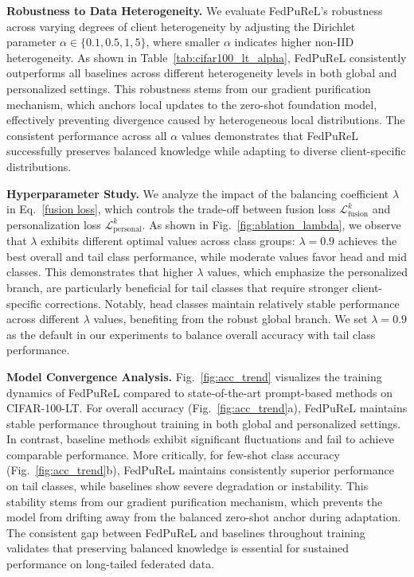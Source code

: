 \noindent \textbf{Robustness to Data Heterogeneity.} We evaluate FedPuReL's robustness across varying degrees of client heterogeneity by adjusting the Dirichlet parameter $\alpha \in \{0.1, 0.5, 1, 5\}$, where smaller $\alpha$ indicates higher non-IID heterogeneity. As shown in Table~\ref{tab:cifar100_lt_alpha}, FedPuReL consistently outperforms all baselines across different heterogeneity levels in both global and personalized settings. This robustness stems from our gradient purification mechanism, which anchors local updates to the zero-shot foundation model, effectively preventing divergence caused by heterogeneous local distributions. The consistent performance across all $\alpha$ values demonstrates that FedPuReL successfully preserves balanced knowledge while adapting to diverse client-specific distributions.

\noindent \textbf{Hyperparameter Study.} We analyze the impact of the balancing coefficient $\lambda$ in Eq.~\ref{fusion loss}, which controls the trade-off between fusion loss $\mathcal{L}^k_{\text{fusion}}$ and personalization loss $\mathcal{L}^k_{\text{personal}}$. As shown in Fig.~\ref{fig:ablation_lambda}, we observe that $\lambda$ exhibits different optimal values across class groups: $\lambda=0.9$ achieves the best overall and tail class performance, while moderate values favor head and mid classes. This demonstrates that higher $\lambda$ values, which emphasize the personalized branch, are particularly beneficial for tail classes that require stronger client-specific corrections. Notably, head classes maintain relatively stable performance across different $\lambda$ values, benefiting from the robust global branch. We set $\lambda=0.9$ as the default in our experiments to balance overall accuracy with tail class performance.

\noindent \textbf{Model Convergence Analysis.} Fig.~\ref{fig:acc_trend} visualizes the training dynamics of FedPuReL compared to state-of-the-art prompt-based methods on CIFAR-100-LT. For overall accuracy (Fig.~\ref{fig:acc_trend}a), FedPuReL maintains stable performance throughout training in both global and personalized settings. In contrast, baseline methods exhibit significant fluctuations and fail to achieve comparable performance. More critically, for few-shot class accuracy (Fig.~\ref{fig:acc_trend}b), FedPuReL maintains consistently superior performance on tail classes, while baselines show severe degradation or instability. This stability stems from our gradient purification mechanism, which prevents the model from drifting away from the balanced zero-shot anchor during adaptation. The consistent gap between FedPuReL and baselines throughout training validates that preserving balanced knowledge is essential for sustained performance on long-tailed federated data.





